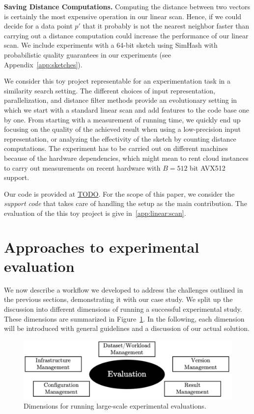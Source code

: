 \documentclass{llncs}
\newcommand{\myparagraph}[1]{\noindent \textbf{#1}}
\begin{document}
\myparagraph{Saving Distance Computations.} Computing the distance 
between two vectors is certainly the most expensive operation in our linear scan. 
Hence, if we could decide for a data point $p'$ that it probably is not the nearest neighbor faster than carrying out a distance computation could increase the performance of our linear scan. 
We include experiments with a 64-bit sketch using SimHash with probabilistic quality guarantees in our experiments (see Appendix~\ref{app:sketches}).

\medskip

We consider this toy project representable for an experimentation task in a similarity search setting. 
The different choices of input representation, parallelization, and distance filter methods provide an evolutionary setting in which we start with a standard linear scan and add features to the code base one by one. 
From starting with a measurement of running time, we quickly end up focusing on the quality of the achieved result when using a low-precision input representation, or analyzing the effectivity of the sketch by counting distance computations.
The experiment has to be carried out on different machines because of the hardware dependencies, which might mean to rent cloud instances to carry out measurements on recent hardware with $B = 512$ bit AVX512 support. 

Our code is provided at \url{TODO}. For the scope of this paper, we consider the \emph{support code} that takes care of handling the setup as the main contribution. The evaluation of the this toy project is give in~\ref{app:linear:scan}.

\section{Approaches to experimental evaluation}
We now describe a workflow we developed to address the challenges outlined
in the previous sections, demonstrating it with our case study.
We split up the discussion into different dimensions of running 
a successful experimental study. 
These dimensions are summarized in Figure~\ref{fig:discussion}. 
In the following, each dimension will be introduced with general
guidelines and a discussion of our actual solution. 

\begin{figure}[t!]
  \includegraphics[width=\textwidth]{figs/discussion_points.png}
  \caption{Dimensions for running large-scale experimental evaluations.}
  \label{fig:discussion}
\end{figure}
\end{document}

